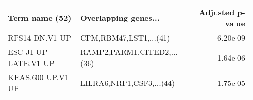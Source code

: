 \begin{tabular}{llr}
\toprule
      Term name (52) &       Overlapping genes... &  Adjusted p-value \\
\midrule
      RPS14 DN.V1 UP &     CPM,RBM47,LST1,...(41) &          6.20e-09 \\
ESC J1 UP LATE.V1 UP & RAMP2,PARM1,CITED2,...(36) &          1.64e-06 \\
   KRAS.600 UP.V1 UP &   LILRA6,NRP1,CSF3,...(44) &          1.75e-05 \\
\bottomrule
\end{tabular}
